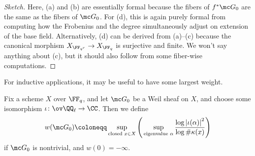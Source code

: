 \documentclass[../notes.tex]{subfiles}
\begin{document}
\begin{proof}[Sketch]
	Here, (a) and (b) are essentially formal because the fibers of $f^*\mc G_0$ are the same as the fibers of $\mc G_0$. For (d), this is again purely formal from computing how the Frobenius and the degree simultaneously adjust on extension of the base field. Alternatively, (d) can be derived from (a)--(c) because the canonical morphism $X_{\FF_{q^r}}\to X_{\FF_q}$ is surjective and finite. We won't say anything about (c), but it should also follow from some fiber-wise computations.
\end{proof}
For inductive applications, it may be useful to have some largest weight.
\begin{definition}
	Fix a scheme $X$ over $\FF_q$, and let $\mc G_0$ be a Weil sheaf on $X$, and choose some isomorphism $\iota\colon\ov\QQ_\ell\to\CC$. Then we define
	\[w(\mc G_0)\coloneqq\sup_{\text{closed }x\in X}\Bigg(\sup_{\text{eigenvalue }\alpha}\frac{\log\left|\iota(\alpha)\right|^2}{\log\#\kappa(x)}\Bigg)\]
	if $\mc G_0$ is nontrivial, and $w(0)=-\infty$.
\end{definition}
\end{document}
